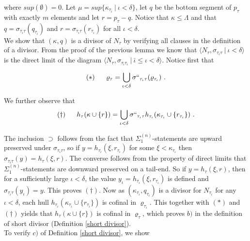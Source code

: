 \documentclass[12pt]{article}
\begin{document}
where $sup(\emptyset) = 0$.  Let $\mu = sup \{ \kappa_{\tau_\iota} \ | \ \iota < \delta \}$, let $q$ be the bottom segment of $p_\tau$ with exactly $m$ elements and let $r = p_\tau - q$.  Notice that $\kappa \leq \Lambda$ and that $q = \sigma_{\tau_\iota \tau} (q_{\tau_\iota})$ and $r = \sigma_{\tau_\iota \tau} (r_{\tau_\iota})$ for all $\iota < \delta$.\\


We show that $( \kappa , q)$ is a divisor of $N_\tau$ by verifying all clauses in the definition of a divisor.  From the proof of the previous lemma we know that $\langle N_\tau , \sigma_{\tau_\iota \tau} \ | \ \iota < \delta \rangle$ is the direct limit of the diagram $\langle N_\tau , \sigma_{\tau_{\bar{\iota}}  \tau_\iota } \ | \ \bar{\iota} \leq \iota < \delta \rangle$.  Notice first that

\[
( * ) \ \ \ \ \ \varrho_\tau = \bigcup_{\iota < \delta } \sigma``_{\tau_\iota \tau} ( \varrho_{\tau_\iota } ) \ .
\]

We further observe that\\

\[
( \dagger ) \ \ \ \ \ h_\tau ( \kappa \cup \{ r \} ) = \bigcup_{\iota < \delta } \sigma``_{\tau_\iota \tau} h_{\tau_\iota } ( \kappa_{\tau_\iota} \cup \{ r_{\tau_\iota} \} ) \ .
\]

The inclusion $\supset$ follows from the fact that $\Sigma_1^{(n)}$-statements are upward preserved under $\sigma_{\tau_\iota \tau}$, so if $y = h_{\tau_\iota} ( \xi , r_{\tau_\iota} )$ for some $\xi < \kappa_{\tau_\iota}$ then $\sigma_{\tau_\iota \tau} (y) = h_\tau (\xi , r)$.  The converse follows from the property of direct limits that $\Sigma_1^{(n)}$-statements are downward preserved on a tail-end.  So if $y = h_\tau (\xi , r)$, then for a sufficiently large $\iota < \delta$, the value $y_\iota = h_{\tau_\iota} ( \xi , r_{\tau_\iota} )$ is defined and $\sigma_{\tau_\iota \tau} (y_\iota) = y$.  This proves $( \dagger )$.  Now as $(\kappa_{\tau_\iota } , q_{\tau_\iota} )$ is a divisor for $N_{\tau_\iota}$ for any $\iota < \delta$, each hull $h_{\tau_\iota} ( \kappa_{\tau_\iota} \cup \{ r_{\tau_\iota } \} )$ is cofinal in $\varrho_{\tau_\iota}$.  This together with $(*)$ and $(\dagger )$ yields that $h_\tau ( \kappa \cup \{ r \} )$ is cofinal in $\varrho_\tau$, which proves $b)$ in the definition of short divisor (Definition \ref{short divisor}).\\

To verify $c)$ of Definition \ref{short divisor}, we show
\end{document}
